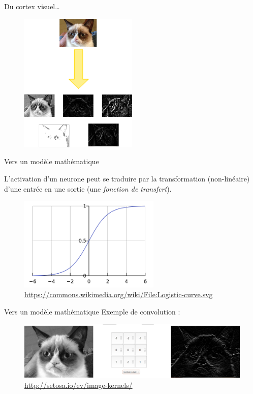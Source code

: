 \documentclass{beamer}
\begin{document}
\begin{frame}{Du cortex visuel\dots}
\begin{figure}
	\includegraphics[width=0.5\textwidth]{filters}
\end{figure}
\end{frame}

\begin{frame}{Vers un modèle mathématique}  

L'activation d'un neurone peut se traduire par la transformation (non-linéaire) d'une entrée en une sortie (une \textit{fonction de transfert}).

\begin{figure}
\includegraphics[width=0.6\textwidth]{sigmoid}\\
\tiny{\url{https://commons.wikimedia.org/wiki/File:Logistic-curve.svg}}
\end{figure}
\end{frame}

\begin{frame}{Vers un modèle mathématique}
Exemple de convolution :
\begin{figure}
\includegraphics[width=\textwidth]{bottom_sobel}\\
\tiny{\url{http://setosa.io/ev/image-kernels/}}
\end{figure}
\end{frame}
\end{document}

